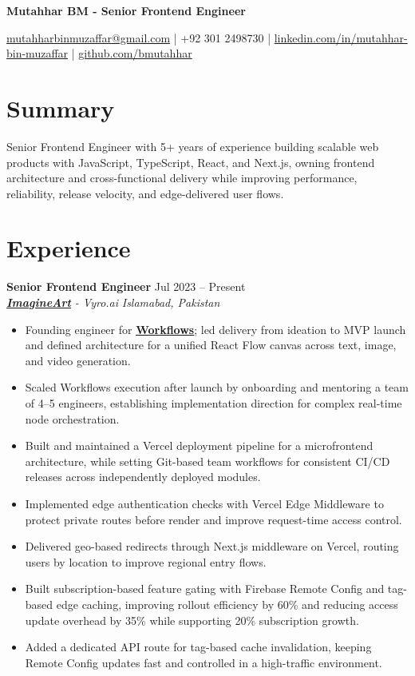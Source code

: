 \documentclass[9pt,letterpaper]{article}
\newcommand{\resumeHeader}[1]{%
  \begin{center}
    \vspace{2pt}
    {\fontsize{18pt}{20pt}\selectfont\bfseries #1\par}
    \vspace{4pt}
  \end{center}
}
\newcommand{\role}[4]{\textbf{#1} \hfill #2 \\
\textit{#3} \hfill \textit{#4}\\[-4pt]}
\begin{document}
\resumeHeader{Mutahhar BM - Senior Frontend Engineer}
\begin{center}
\fontsize{9pt}{11pt}\selectfont
\href{mailto:mutahharbinmuzaffar@gmail.com}{mutahharbinmuzaffar@gmail.com} \;|\; +92 301 2498730 \;|\;
\href{https://www.linkedin.com/in/mutahhar-bin-muzaffar}{linkedin.com/in/mutahhar-bin-muzaffar} \;|\;
\href{https://github.com/bmutahhar}{github.com/bmutahhar}
\end{center}

\section*{Summary}
Senior Frontend Engineer with 5+ years of experience building scalable web products with JavaScript, TypeScript, React, and Next.js, owning frontend architecture and cross-functional delivery while improving performance, reliability, release velocity, and edge-delivered user flows.

\section*{Experience}
\role{Senior Frontend Engineer}{Jul 2023 -- Present}{\href{https://www.imagine.art/}{\textbf{\underline{ImagineArt}}} - Vyro.ai}{Islamabad, Pakistan}
\begin{itemize}[leftmargin=*, itemsep=0pt, topsep=0pt, partopsep=0pt, parsep=0pt, after=\vspace{2pt}]
  \item Founding engineer for \href{https://www.imagine.art/flow}{\textbf{\underline{Workflows}}}; led delivery from ideation to MVP launch and defined architecture for a unified React Flow canvas across text, image, and video generation.
  \item Scaled Workflows execution after launch by onboarding and mentoring a team of 4--5 engineers, establishing implementation direction for complex real-time node orchestration.
  \item Built and maintained a Vercel deployment pipeline for a microfrontend architecture, while setting Git-based team workflows for consistent CI/CD releases across independently deployed modules.
  \item Implemented edge authentication checks with Vercel Edge Middleware to protect private routes before render and improve request-time access control.
  \item Delivered geo-based redirects through Next.js middleware on Vercel, routing users by location to improve regional entry flows.
  \item Built subscription-based feature gating with Firebase Remote Config and tag-based edge caching, improving rollout efficiency by 60\% and reducing access update overhead by 35\% while supporting 20\% subscription growth.
  \item Added a dedicated API route for tag-based cache invalidation, keeping Remote Config updates fast and controlled in a high-traffic environment.

\end{itemize}
\end{document}
